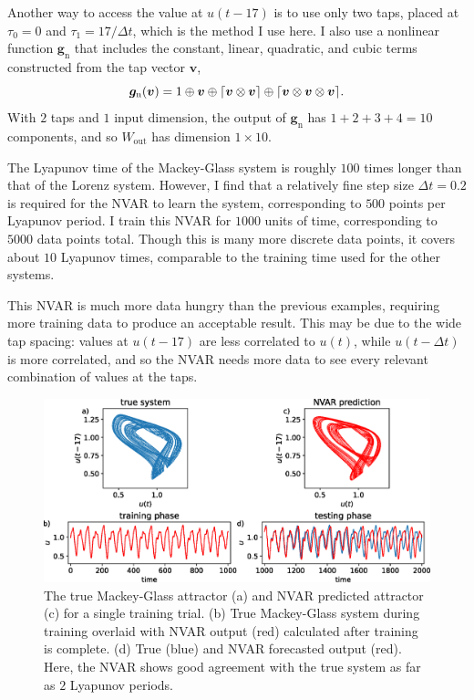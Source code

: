 Another way to access the value at $u(t-17)$ is to use only two taps,
placed at $\tau_0 = 0$ and $\tau_1 = 17 / \Delta t$, which is the
method I use here. I also use a nonlinear function
$\bm{g}_\text{n}$ that includes the constant, linear, quadratic, and
cubic terms constructed from the tap vector $\bm{v}$,
\begin{equation}
  \bm{g}_\text{n}(\bm{v}) = 1 \oplus \bm{v} \oplus \lceil\bm{v} \otimes \bm{v}\rceil \oplus \lceil\bm{v} \otimes \bm{v} \otimes \bm{v}\rceil.
\end{equation}
With $2$ taps and $1$ input dimension, the output of $\bm{g}_\text{n}$
has $1 + 2 + 3 + 4 = 10$ components, and so $W_\text{out}$ has
dimension $1 \times 10$.

The Lyapunov time of the Mackey-Glass system is roughly $100$ times
longer than that of the Lorenz system. However, I find that a
relatively fine step size $\Delta t = 0.2$ is required for the NVAR to
learn the system, corresponding to $500$ points per Lyapunov period. I train this NVAR for $1000$ units of time,
corresponding to $5000$ data points total. Though this is many more
discrete data points, it covers about $10$ Lyapunov times, comparable
to the training time used for the other systems.

This NVAR is much more data hungry than the previous examples,
requiring more training data to produce an acceptable result. This may
be due to the wide tap spacing: values at $u(t - 17)$ are less
correlated to $u(t)$, while $u(t - \Delta t)$ is more correlated, and
so the NVAR needs more data to see every relevant combination of
values at the taps.

\begin{figure}
  \includegraphics[width=\textwidth]{figures/nvar-predict-mackey-glass}
  \caption{The true Mackey-Glass attractor (a) and NVAR predicted
    attractor (c) for a single training trial. (b) True Mackey-Glass
    system during training overlaid with NVAR output (red) calculated
    after training is complete. (d) True (blue) and NVAR forecasted
    output (red). Here, the NVAR shows good agreement with the true
    system as far as $2$ Lyapunov periods.}
  \label{fig:nvar-predict-mackey-glass}
\end{figure}


